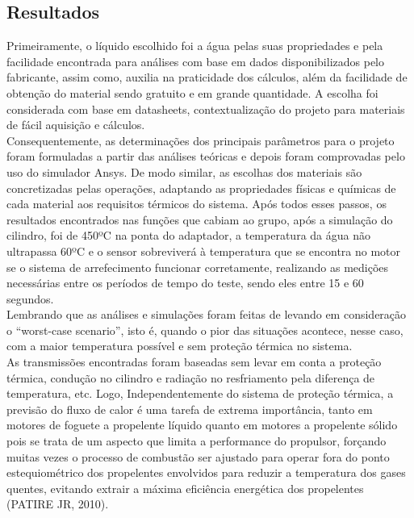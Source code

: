 \subsection{Resultados}
Primeiramente, o líquido escolhido foi a água pelas suas propriedades e pela facilidade encontrada para análises com base em dados disponibilizados pelo fabricante, assim como, auxilia na praticidade dos cálculos, além da facilidade de obtenção do material sendo gratuito e em grande quantidade. A escolha foi considerada com base em datasheets, contextualização do projeto para materiais de fácil aquisição e cálculos.\\
Consequentemente, as determinações dos principais parâmetros para o projeto foram formuladas a partir das análises teóricas e depois foram comprovadas pelo uso do simulador Ansys. De modo similar, as escolhas dos materiais são concretizadas pelas operações, adaptando as propriedades físicas e químicas de cada material aos requisitos térmicos do sistema.
Após todos esses passos, os resultados encontrados nas funções que cabiam ao grupo, após a simulação do cilindro, foi de 450ºC na ponta do adaptador, a temperatura da água não ultrapassa 60ºC e o sensor sobreviverá à temperatura que se encontra no motor se o sistema de arrefecimento funcionar corretamente, realizando as medições necessárias entre os períodos de tempo do teste, sendo eles entre 15 e 60 segundos.\\ Lembrando que as análises e simulações foram feitas de levando em consideração o “worst-case scenario”, isto é, quando o pior das situações acontece, nesse caso, com a maior temperatura possível e sem proteção térmica no sistema.\\
As transmissões encontradas foram baseadas sem levar em conta a proteção térmica, condução no cilindro e radiação no resfriamento pela diferença de temperatura, etc. Logo, Independentemente do sistema de proteção térmica, a previsão do fluxo de calor é uma tarefa de extrema importância, tanto em motores de foguete a propelente líquido quanto em motores a propelente sólido pois se trata de um aspecto que limita a performance do propulsor, forçando muitas vezes o processo de combustão ser ajustado para operar fora do ponto estequiométrico dos propelentes envolvidos para reduzir a temperatura dos gases quentes, evitando extrair a máxima eficiência energética dos propelentes (PATIRE JR, 2010). 

     
